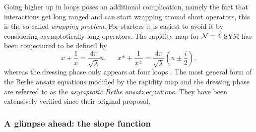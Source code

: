 Going higher up in loops poses an additional complication, namely the fact that interactions get long ranged and can start wrapping around short operators, this is the so-called \emph{wrapping problem}.
For starters it is easiest to avoid it by considering asymptotically long operators. 
The rapidity map for $\mathcal{N}=4$ SYM has been conjectured to be defined by
\begin{equation}
	x + \frac{1}{x} = \frac{4 \pi}{\sqrt{\lambda}} u, \,\,\,\,\,\,\,\,\, x^{\pm} + \frac{1}{x^{\pm}} = \frac{4 \pi}{\sqrt{\lambda}} \left( u \pm \frac{i}{2} \right),
\end{equation}
whereas the dressing phase only appears at four loops \cite{dressing}. 
The most general form of the Bethe ansatz equations  modified by the rapidity map and the dressing phase are referred to as the \emph{asymptotic Bethe ansatz} equations.
They have been extensively verified \cite{aba_tests,aba_tests2} since their original proposal.


\subsubsection{A glimpse ahead: the slope function}

